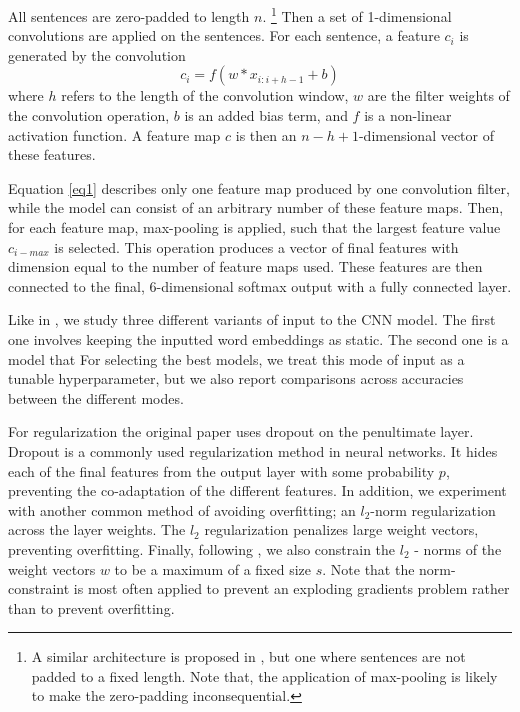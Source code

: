 \documentclass[conference]{IEEEtran}
\begin{document}
All sentences are zero-padded to length $n$.
\footnote{A similar architecture is proposed in \cite{johnsonetal}, but one where sentences are not padded to a fixed length.  Note that, the application of max-pooling is likely to make the zero-padding inconsequential.}
Then a set of 1-dimensional convolutions are applied on the sentences. For each sentence, a feature $c_i$ is generated by the convolution
\begin{equation}
c_i = f(w * x_{i:i+h-1} + b)\label{eq1}
\end{equation}
where $h$ refers to the length of the convolution window, $w$ are the filter weights of the convolution operation, $b$ is an added bias term, and $f$ is a non-linear activation function. A feature map $c$ is then an $n-h+1$-dimensional vector of these features.

Equation \eqref{eq1} describes only one feature map produced by one convolution filter, while the model can consist of an arbitrary number of these feature maps. Then, for each feature map, max-pooling is applied, such that the largest feature value $c_{i-max}$ is selected. This operation produces a vector of final features with dimension equal to the number of feature maps used. These features are then connected to the final, 6-dimensional softmax output with a fully connected layer.

Like in \cite{kim-2014-convolutional}, we study three different variants of input to the CNN model. The first one involves keeping the inputted word embeddings as static. The second one is a model that For selecting the best models, we treat this mode of input as a tunable hyperparameter, but we also report comparisons across accuracies between the different modes.

For regularization the original paper uses dropout on the penultimate layer. Dropout is a commonly used regularization method in neural networks. It hides each of the final features from the output layer with some probability $p$, preventing the co-adaptation of the different features. In addition, we experiment with another common method of avoiding overfitting; an $l_2$-norm regularization across the layer weights. The $l_2$ regularization penalizes large weight vectors, preventing overfitting.  Finally, following \cite{kim-2014-convolutional}, we also constrain the $l_2$ - norms of the weight vectors $w$ to be a maximum of a fixed size $s$. Note that the norm-constraint is most often applied to prevent an exploding gradients problem rather than to prevent overfitting.
\end{document}
